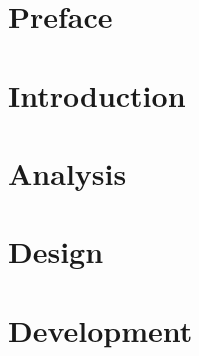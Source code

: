 
%
%
\sloppy


% 
% 
%

%
%

% 
%

% 
%


\chapter*{Preface}

% 
%
\newpage{}
\tableofcontents*

%
%

%
%

%
%
\chapter{Introduction}
\label{chap:intro}

\newpage{}
%


\chapter{Analysis}
\label{chap:analysis}

\newpage{}






\chapter{Design}
\label{chap:Design}


\chapter{Development}
\label{chap:development}
%
\newpage{}
%
%
%
%
%

